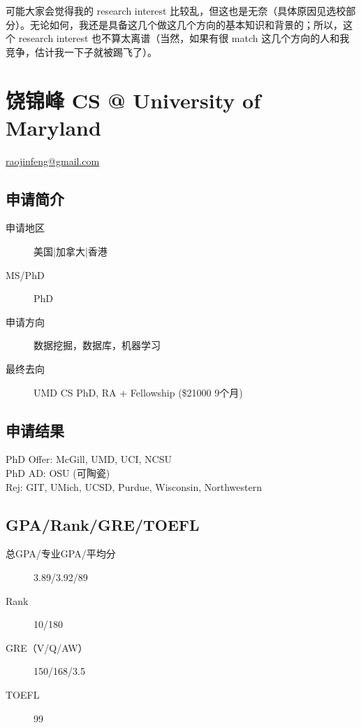 \documentclass[11pt,fleqn,openany]{book} %
\begin{document}
可能大家会觉得我的 research interest 比较乱，但这也是无奈（具体原因见选校部分）。无论如何，我还是具备这几个做这几个方向的基本知识和背景的；所以，这个 research interest 也不算太离谱（当然，如果有很 match 这几个方向的人和我竞争，估计我一下子就被踢飞了）。
\clearpage



\section{饶锦峰 CS @ University of Maryland}
\hfill \href{mailto:raojinfeng@gmail.com}{raojinfeng@gmail.com}

\noindent\begin{minipage}[t]{0.45\textwidth}
\subsection*{申请简介}
\begin{description}
\item[申请地区] 美国|加拿大|香港
\item[MS/PhD] PhD
\item[申请方向] 数据挖掘，数据库，机器学习
\item[最终去向] UMD CS PhD, RA + Fellowship (\$21000 9个月)
\end{description}
\end{minipage}
\hfill
\begin{minipage}[t]{0.45\textwidth}
\subsection*{申请结果}
\noindent PhD Offer: McGill, UMD, UCI, NCSU\\
PhD AD: OSU (可陶瓷)\\
Rej: GIT, UMich, UCSD, Purdue, Wisconsin, Northwestern
\end{minipage}
\subsection*{GPA/Rank/GRE/TOEFL}
\begin{description}
\item[总GPA/专业GPA/平均分] 3.89/3.92/89
\item[Rank] 10/180
\item[GRE（V/Q/AW）] 150/168/3.5
\item[TOEFL] 99
\end{description}
\end{document}
